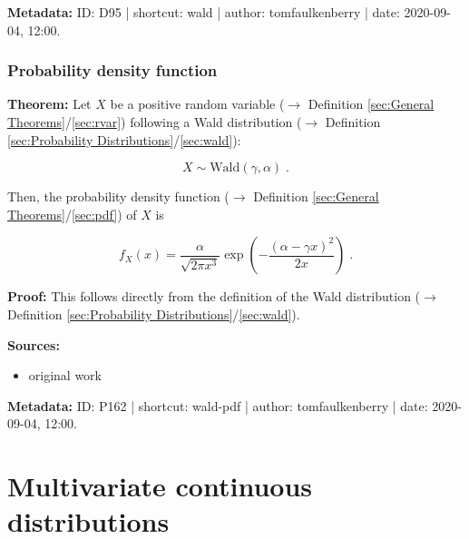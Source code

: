 \documentclass[a4paper,12pt,twoside]{book}
\begin{document}
\vspace{1em}
\textbf{Metadata:} ID: D95 | shortcut: wald | author: tomfaulkenberry | date: 2020-09-04, 12:00.
\vspace{1em}



\subsubsection[\textbf{Probability density function}]{Probability density function} \label{sec:wald-pdf}
\setcounter{equation}{0}

\textbf{Theorem:} Let $X$ be a positive random variable ($\rightarrow$ Definition \ref{sec:General Theorems}/\ref{sec:rvar}) following a Wald distribution ($\rightarrow$ Definition \ref{sec:Probability Distributions}/\ref{sec:wald}):

\begin{equation} \label{eq:wald-pdf-wald}
X \sim \mathrm{Wald}(\gamma, \alpha) \; .
\end{equation}

Then, the probability density function ($\rightarrow$ Definition \ref{sec:General Theorems}/\ref{sec:pdf}) of $X$ is

\begin{equation} \label{eq:wald-pdf-wald-pdf}
f_X(x) = \frac{\alpha}{\sqrt{2\pi x^3}}\exp\left(-\frac{(\alpha-\gamma x)^2}{2x}\right) \; .
\end{equation}


\vspace{1em}
\textbf{Proof:} This follows directly from the definition of the Wald distribution ($\rightarrow$ Definition \ref{sec:Probability Distributions}/\ref{sec:wald}).


\vspace{1em}
\textbf{Sources:}
\begin{itemize}
\item original work\end{itemize}


\vspace{1em}
\textbf{Metadata:} ID: P162 | shortcut: wald-pdf | author: tomfaulkenberry | date: 2020-09-04, 12:00.
\vspace{1em}



\pagebreak
\section{Multivariate continuous distributions}
\end{document}
